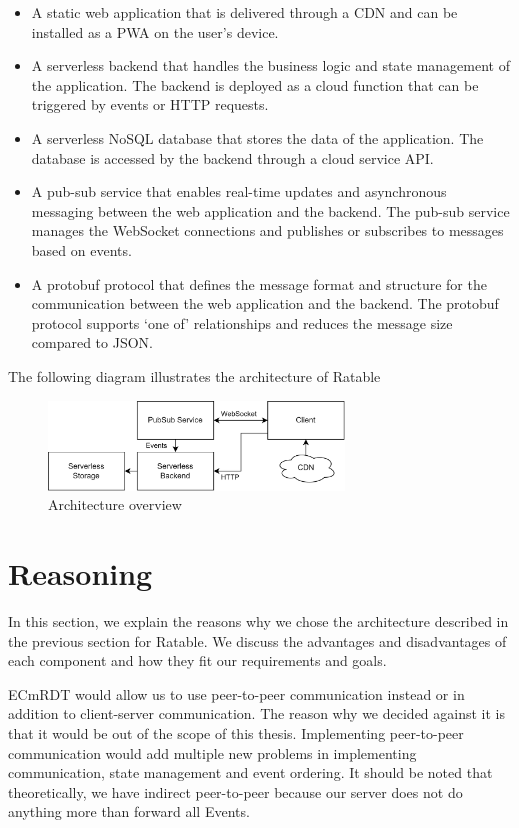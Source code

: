\documentclass[
	ngerman,
	ruledheaders=section,   %
	class=report,		    %
	thesis={type=bachelor}, %
	accentcolor=9c,			%
	custommargins=true,    %
	marginpar=false,        %
	parskip=half-,          %
	fontsize=11pt,          %
]{tudapub}
\begin{document}
\begin{itemize}
  \item A static web application that is delivered through a CDN and can be installed as a PWA on the user’s device.
  \item A serverless backend that handles the business logic and state management of the application. The backend is deployed as a cloud function that can be triggered by events or HTTP requests.
  \item A serverless NoSQL database that stores the data of the application. The database is accessed by the backend through a cloud service API.
  \item A pub-sub service that enables real-time updates and asynchronous messaging between the web application and the backend. The pub-sub service manages the WebSocket connections and publishes or subscribes to messages based on events.
  \item A protobuf protocol that defines the message format and structure for the communication between the web application and the backend. The protobuf protocol supports ‘one of’ relationships and reduces the message size compared to JSON.
\end{itemize}
The following diagram illustrates the architecture of Ratable

\begin{figure}[h]
  \centering
  \includegraphics[width=0.7\textwidth]{architecture_services.png}
  \caption{Architecture overview}
\end{figure}

\section{Reasoning}
In this section, we explain the reasons why we chose the architecture described in the previous section for Ratable. We discuss the advantages and disadvantages of each component and how they fit our requirements and goals.

ECmRDT would allow us to use peer-to-peer communication instead or in addition to client-server communication. The reason why we decided against it is that it would be out of the scope of this thesis. Implementing peer-to-peer communication would add multiple new problems in implementing communication, state management and event ordering. It should be noted that theoretically, we have indirect peer-to-peer because our server does not do anything more than forward all Events.
\end{document}

